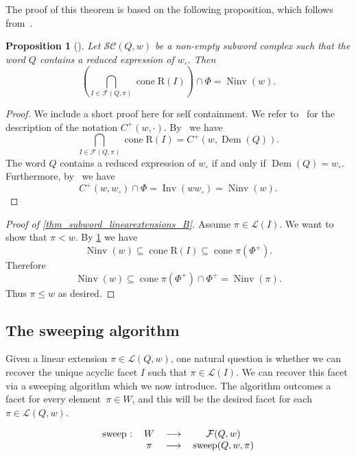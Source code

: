 \documentclass{amsart}
\newtheorem{proposition}[theorem]{Proposition}
\theoremstyle{definition}
\DeclareMathOperator{\cone}{cone} %
\DeclareMathOperator{\Inv}{Inv} %
\DeclareMathOperator{\Ninv}{Ninv} %
\DeclareMathOperator{\DemazureProduct}{Dem} %
\newcommand{\linearExtensions}{\mathcal{L}} %
\newcommand{\wo}{w_\circ} %
\newcommand{\subwordComplex}{\mathcal{SC}} %
\newcommand{\Roots}{\mathrm{R}} %
\newcommand{\subwordFacets}{\mathcal{F}} %
\newcommand{\sweepingAlgorithm}{\mathrm{sweep}} %
\begin{document}
The proof of this theorem is based on the following proposition, which follows from~\cite[Theorem~3.1 and Corollary 3.3]{JahnStump}.

\begin{proposition}[{\cite{JahnStump}}]\label{prop_jahnStump_intersection}
    Let $\subwordComplex(Q,w)$ be a non-empty subword complex such that the word $Q$ contains a reduced expression of $\wo$.
Then 
    \[
\left(
\bigcap_{I\in \subwordFacets(Q,\pi)} \cone \Roots(I) 
\right)
\cap \Phi
= 
\Ninv(w).
    \]
\end{proposition}
\begin{proof}
    We include a short proof here for self containment.
We refer to~\cite{JahnStump} for the description of the notation $C^+(w,\cdot)$.
    By~\cite[Theorem~3.1]{JahnStump} we have
    \[
\bigcap_{I\in \subwordFacets(Q,\pi)} \cone \Roots(I) =
C^+(w,\DemazureProduct(Q)).
    \]
    The word $Q$ contains a reduced expression of $\wo$ if and only if $\DemazureProduct(Q)=\wo$.
Furthermore, by~\cite[Corollary~3.3]{JahnStump} we have
    \[
C^+(w,\wo)\cap \Phi
= \Inv(w \wo) = \Ninv(w).
    \]    
\end{proof}

\begin{proof}[Proof of \cref{thm_subword_linearextensions_B}]
Assume $\pi\in \linearExtensions(I)$.
We want to show that $\pi<w$.
By \cref{prop_jahnStump_intersection} we have 
\[
\Ninv(w) 
\subseteq \cone \Roots(I) 
\subseteq \cone \pi(\Phi^+).
\]
Therefore
\[
\Ninv(w) 
\subseteq \cone \pi(\Phi^+) \cap \Phi^+ 
= \Ninv(\pi).
\]
Thus $\pi \leq w$ as desired.
\end{proof}




\subsection{The sweeping algorithm}

Given a linear extension $\pi \in \linearExtensions(Q,w)$, one natural question is whether we can recover the unique acyclic facet $I$ such that $\pi \in \linearExtensions(I)$.
We can recover this facet via a sweeping algorithm which we now introduce.
The algorithm outcomes a facet for every element~$\pi \in W$, and this will be the desired facet for each $\pi \in \linearExtensions(Q,w)$.

\[
\begin{tabular}{cccc}
$\sweepingAlgorithm$ : & $W$  &$\longrightarrow$ &$\subwordFacets(Q,w)$\\
    & $\pi$ & $\longrightarrow$ & $\sweepingAlgorithm(Q,w,\pi)$
\end{tabular}
\]
\end{document}
